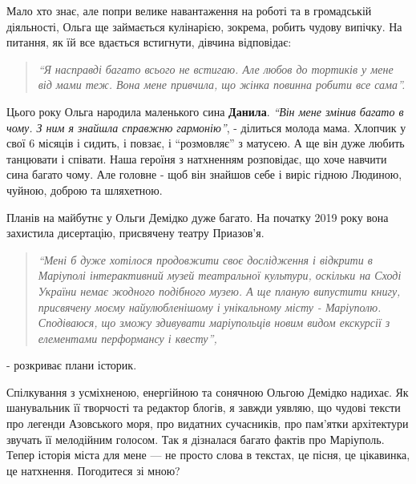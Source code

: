
Мало хто знає, але попри велике навантаження на роботі та в громадській
діяльності, Ольга ще займається кулінарією, зокрема, робить чудову випічку. На
питання, як їй все вдається встигнути, дівчина відповідає: 

\begin{quote}
\em\enquote{Я насправді багато
всього не встигаю. Але любов до тортиків у мене від мами теж. Вона мене
привчила, що жінка повинна робити все сама}.
\end{quote}


Цього року Ольга народила маленького сина \textbf{Данила}. \emph{\enquote{Він мене змінив багато в
чому. З ним я знайшла справжню гармонію}}, - ділиться молода мама. Хлопчик у
свої 6 місяців і сидить, і повзає, і \enquote{розмовляє} з матусею. А ще він дуже
любить танцювати і співати. Наша героїня з натхненням розповідає, що хоче
навчити сина багато чому. Але головне - щоб він знайшов себе і виріс гідною
Людиною, чуйною, доброю та шляхетною.

Планів на майбутнє у Ольги Демідко дуже багато. На початку 2019 року вона
захистила дисертацію, присвячену театру Приазов'я.


\begin{quote}
\em\enquote{Мені б дуже хотілося продовжити своє дослідження і відкрити в
Маріуполі інтерактивний музей театральної культури, оскільки на Сході
України немає жодного подібного музею.  А ще планую випустити книгу,
присвячену моєму найулюбленішому і унікальному місту - Маріуполю.
Сподіваюся, що зможу здивувати маріупольців новим видом екскурсії з
елементами перформансу і квесту}, 
\end{quote}
- розкриває плани історик.

Спілкування з усміхненою, енергійною та сонячною Ольгою Демідко надихає. Як
шанувальник її творчості та редактор блогів, я завжди уявляю, що чудові тексти
про легенди Азовського моря, про видатних сучасників, про пам'ятки архітектури
звучать її мелодійним голосом. Так я дізналася багато фактів про Маріуполь.
Тепер історія міста для мене — не просто слова в текстах, це пісня, це
цікавинка, це натхнення. Погодитеся зі мною?

